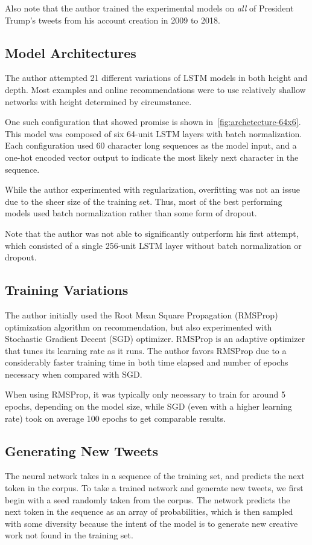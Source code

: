 \documentclass[letterpaper]{article}
\begin{document}
        Also note that the author trained the experimental models on \textit{all} of President Trump's tweets from his account creation in 2009 to 2018.

    \subsection{Model Architectures}
        The author attempted 21 different variations of LSTM models in both height and depth. Most examples and online recommendations were to use relatively shallow networks with height determined by circumstance.

        One such configuration that showed promise is shown in~\autoref{fig:archetecture-64x6}. This model was composed of six 64-unit LSTM layers with batch normalization. Each configuration used 60 character long sequences as the model input, and a one-hot encoded vector output to indicate the most likely next character in the sequence.

        While the author experimented with regularization, overfitting was not an issue due to the sheer size of the training set. Thus, most of the best performing models used batch normalization rather than some form of dropout.

        Note that the author was not able to significantly outperform his first attempt, which consisted of a single 256-unit LSTM layer without batch normalization or dropout.

    \subsection{Training Variations}
        The author initially used the Root Mean Square Propagation (RMSProp) optimization algorithm on recommendation, but also experimented with Stochastic Gradient Decent (SGD) optimizer. RMSProp is an adaptive optimizer that tunes its learning rate as it runs. The author favors RMSProp due to a considerably faster training time in both time elapsed and number of epochs necessary when compared with SGD.

        When using RMSProp, it was typically only necessary to train for around 5 epochs, depending on the model size, while SGD (even with a higher learning rate) took on average 100 epochs to get comparable results.

    \subsection{Generating New Tweets}
        The neural network takes in a sequence of the training set, and predicts the next token in the corpus. To take a trained network and generate new tweets, we first begin with a seed randomly taken from the corpus. The network predicts the next token in the sequence as an array of probabilities, which is then sampled with some diversity because the intent of the model is to generate new creative work not found in the training set.
\end{document}
